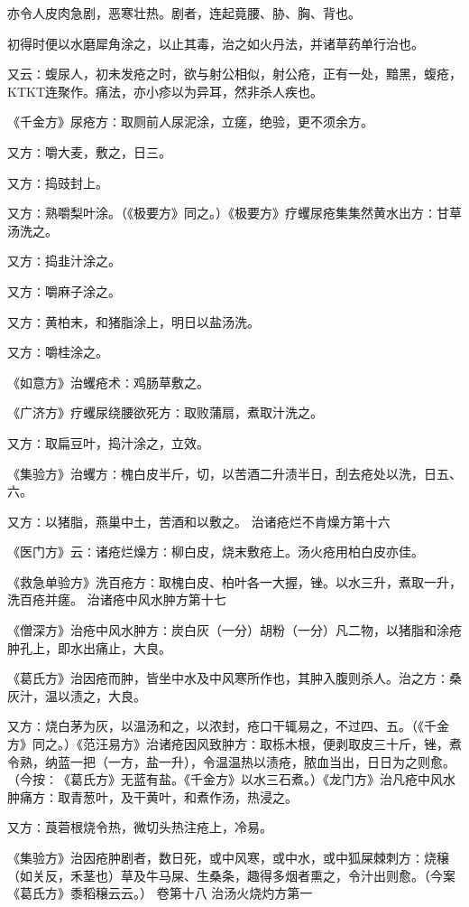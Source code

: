 \documentclass[a4paper,12pt,UTF8,twoside]{ctexbook}
\begin{document}
亦令人皮肉急剧，恶寒壮热。剧者，连起竟腰、胁、胸、背也。

初得时便以水磨犀角涂之，以止其毒，治之如火丹法，并诸草药单行治也。

又云∶蝮尿人，初未发疮之时，欲与射公相似，射公疮，正有一处，黯黑，蝮疮，KTKT连聚作。痛法，亦小疹以为异耳，然非杀人疾也。

《千金方》尿疮方∶取厕前人尿泥涂，立瘥，绝验，更不须余方。

又方∶嚼大麦，敷之，日三。

又方∶捣豉封上。

又方∶熟嚼梨叶涂。（《极要方》同之。）《极要方》疗蠼尿疮集集然黄水出方∶甘草汤洗之。

又方∶捣韭汁涂之。

又方∶嚼麻子涂之。

又方∶黄柏末，和猪脂涂上，明日以盐汤洗。

又方∶嚼桂涂之。

《如意方》治蠼疮术∶鸡肠草敷之。

《广济方》疗蠼尿绕腰欲死方∶取败蒲扇，煮取汁洗之。

又方∶取扁豆叶，捣汁涂之，立效。

《集验方》治蠼方∶槐白皮半斤，切，以苦酒二升渍半日，刮去疮处以洗，日五、六。

又方∶以猪脂，燕巢中土，苦酒和以敷之。
治诸疮烂不肯燥方第十六

《医门方》云∶诸疮烂燥方∶柳白皮，烧末敷疮上。汤火疮用柏白皮亦佳。

《救急单验方》洗百疮方∶取槐白皮、柏叶各一大握，锉。以水三升，煮取一升，洗百疮并瘥。
治诸疮中风水肿方第十七

《僧深方》治疮中风水肿方∶炭白灰（一分）胡粉（一分）凡二物，以猪脂和涂疮肿孔上，即水出痛止，大良。

《葛氏方》治因疮而肿，皆坐中水及中风寒所作也，其肿入腹则杀人。治之方∶桑灰汁，温以渍之，大良。

又方∶烧白茅为灰，以温汤和之，以浓封，疮口干辄易之，不过四、五。（《千金方》同之。）《范汪易方》治诸疮因风致肿方∶取栎木根，便剥取皮三十斤，锉，煮令熟，纳蓝一把（一方，盐一升），令温温热以渍疮，脓血当出，日日为之则愈。（今按∶《葛氏方》无蓝有盐。《千金方》以水三石煮。）《龙门方》治凡疮中风水肿痛方∶取青葱叶，及干黄叶，和煮作汤，热浸之。

又方∶莨菪根烧令热，微切头热注疮上，冷易。

《集验方》治因疮肿剧者，数日死，或中风寒，或中水，或中狐屎棘刺方∶烧穣（如关反，禾茎也）草及牛马屎、生桑条，趣得多烟者熏之，令汁出则愈。（今案《葛氏方》黍稻穣云云。）
卷第十八
治汤火烧灼方第一
\end{document}
